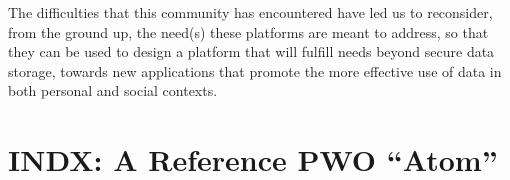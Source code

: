 \documentclass{acm_proc_article-sp}
\begin{document}

The difficulties that this community has encountered have led us to reconsider, from the ground up, the need(s) these platforms are meant to address, so that they can be used to design a platform that will fulfill needs beyond secure data storage, towards new applications that promote the more effective use of data in both personal and social contexts.




\section{INDX: A Reference PWO ``Atom''}
\end{document}
